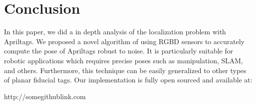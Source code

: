 \section{Conclusion}
\label{sec:conclusion}
In this paper, we did a in depth analysis of the localization problem with Apriltags. We proposed a novel algorithm of using RGBD sensors to accurately compute the pose of Apriltags robust to noise. It is particularly suitable for robotic applications which requires precise poses such as manipulation, SLAM, and others. Furthermore, this technique can be easily generalized to other types of planar fiducial tags. Our implementation is fully open sourced and available at:

	http://somegithublink.com
